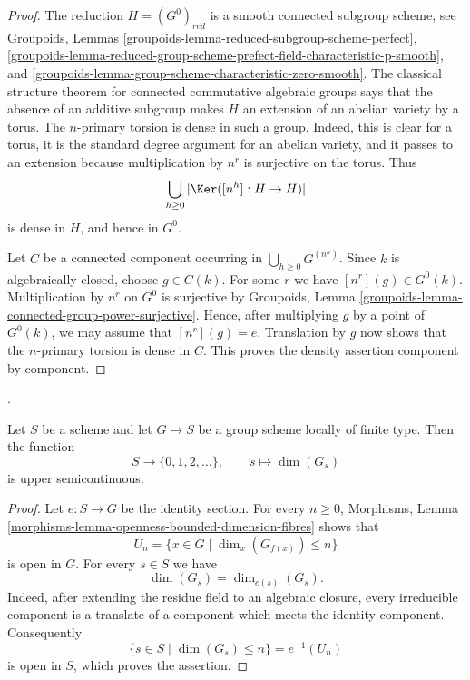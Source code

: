 \begin{proof}
The reduction $H=(G^0)_{red}$ is a smooth connected subgroup scheme, see
Groupoids, Lemmas \ref{groupoids-lemma-reduced-subgroup-scheme-perfect},
\ref{groupoids-lemma-reduced-group-scheme-prefect-field-characteristic-p-smooth},
and \ref{groupoids-lemma-group-scheme-characteristic-zero-smooth}. The
classical structure theorem for connected commutative algebraic groups says
that the absence of an additive subgroup makes $H$ an extension of an
abelian variety by a torus. The $n$-primary torsion is dense in such a group.
Indeed, this is clear for a torus, it is the standard degree argument for an
abelian variety, and it passes to an extension because multiplication by
$n^r$ is surjective on the torus. Thus
$$
\bigcup_{h \geq 0}|\Ker([n^h] : H \to H)|
$$
is dense in $H$, and hence in $G^0$.

Let $C$ be a connected component occurring in
$\bigcup_{h \geq 0}G^{(n^h)}$. Since $k$ is algebraically closed, choose
$g \in C(k)$. For some $r$ we have $[n^r](g) \in G^0(k)$. Multiplication by
$n^r$ on $G^0$ is surjective by Groupoids, Lemma
\ref{groupoids-lemma-connected-group-power-surjective}. Hence, after
multiplying $g$ by a point of $G^0(k)$, we may assume that
$[n^r](g)=e$. Translation by $g$ now shows that the $n$-primary torsion is
dense in $C$. This proves the density assertion component by component.
\end{proof}

\begin{lemma}
\label{lemma-group-scheme-fibre-dimension-upper-semicontinuous}
\begin{reference}
\cite[Expos\'e 236, Corollary 2.7, p. 234]{FGA}.
\end{reference}
Let $S$ be a scheme and let $G \to S$ be a group scheme locally of finite
type. Then the function
$$
S \longrightarrow \{0,1,2,\ldots\}, \qquad
s \longmapsto \dim(G_s)
$$
is upper semicontinuous.
\end{lemma}

\begin{proof}
Let $e:S\to G$ be the identity section. For every $n\geq 0$, Morphisms,
Lemma \ref{morphisms-lemma-openness-bounded-dimension-fibres} shows that
$$
U_n=\{x\in G\mid \dim_x(G_{f(x)})\leq n\}
$$
is open in $G$. For every $s\in S$ we have
$$
\dim(G_s)=\dim_{e(s)}(G_s).
$$
Indeed, after extending the residue field to an algebraic closure, every
irreducible component is a translate of a component which meets the identity
component. Consequently
$$
\{s\in S\mid \dim(G_s)\leq n\}=e^{-1}(U_n)
$$
is open in $S$, which proves the assertion.
\end{proof}

